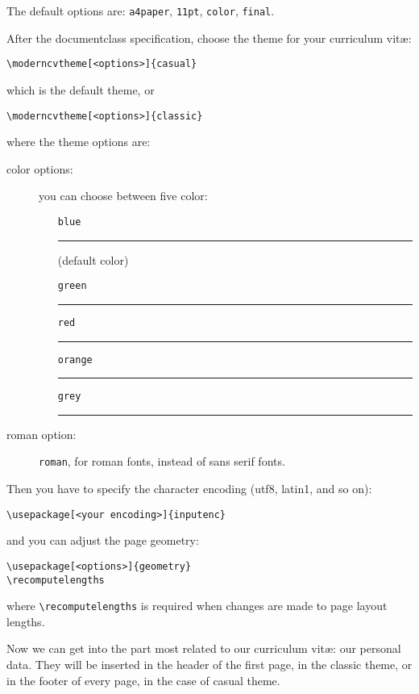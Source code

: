 \documentclass[a4paper,11pt,draft]{article}
\begin{document}
The default options are: \texttt{a4paper}, \texttt{11pt}, \texttt{color}, \texttt{final}. 

After the documentclass specification, choose the theme for your curriculum vit\ae:

\begin{verbatim}
\moderncvtheme[<options>]{casual}
\end{verbatim} 

which is the default theme, or

\begin{verbatim}
\moderncvtheme[<options>]{classic}
\end{verbatim} 

where the theme options are:

\begin{description}
 \item[color options:] you can choose between five color: 
	\begin{itemize}
	 \item[\texttt{blue}] {\color{bluecv}\rule{1cm}{2ex}} (default color)
	 \item[\texttt{green}] {\color{greencv}\rule{1cm}{2ex}}
	 \item[\texttt{red}] {\color{redcv}\rule{1cm}{2ex}}
	 \item[\texttt{orange}] {\color{orangecv}\rule{1cm}{2ex}}
	 \item[\texttt{grey}] {\color{greycv}\rule{1cm}{2ex}}
	\end{itemize}
 \item[roman option:] \texttt{roman}, for {\fontsize{11}{12} \selectfont roman} fonts, instead of \fontsize{11}{12} \selectfont sans serif fonts.
\end{description}

Then you have to specify the character encoding (utf8, latin1, and so on):

\begin{verbatim}
\usepackage[<your encoding>]{inputenc}
\end{verbatim} 

and you can adjust the page geometry:

\begin{verbatim}
\usepackage[<options>]{geometry}
\recomputelengths
\end{verbatim} 

where \verb|\recomputelengths| is required when changes are made to page layout lengths.

Now we can get into the part most related to our curriculum vit\ae: our personal data. They will be inserted in the header of the first page, in the classic theme, or in the footer of every page, in the case of casual theme.
\end{document}
